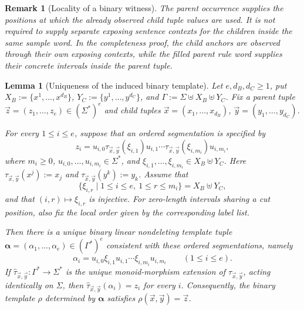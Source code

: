 \documentclass[11pt,a4paper]{article}
\newtheorem{lemma}[theorem]{Lemma}
\newtheorem{remark}[theorem]{Remark}
\theoremstyle{remark}
\newcommand{\tuple}[1]{\vec{#1}}
\begin{document}
\begin{remark}[Locality of a binary witness]
\label{rem:binary-witness-locality}
The parent occurrence supplies the positions at which the already observed
child tuple values are used.  It is not required to supply separate exposing
sentence contexts for the children inside the same sample word.  In the
completeness proof, the child anchors are observed through their own exposing
contexts, while the filled parent rule word supplies their concrete intervals
inside the parent tuple.
\end{remark}

\begin{lemma}[Uniqueness of the induced binary template]
\label{lem:unique-induced-template}
Let \(e,d_B,d_C\ge1\), put
\(X_B:=\{x^1,\ldots,x^{d_B}\}\),
\(Y_C:=\{y^1,\ldots,y^{d_C}\}\), and
\(\Gamma:=\Sigma\uplus X_B\uplus Y_C\).  Fix a parent tuple
\(\tuple z=(z_1,\ldots,z_e)\in(\Sigma^*)^e\) and child tuples
\(\tuple x=(x_1,\ldots,x_{d_B})\),
\(\tuple y=(y_1,\ldots,y_{d_C})\).

For every \(1\le i\le e\), suppose that an ordered segmentation is specified by
\[
  z_i=u_{i,0}\tau_{\tuple x,\tuple y}(\xi_{i,1})u_{i,1}\cdots
      \tau_{\tuple x,\tuple y}(\xi_{i,m_i})u_{i,m_i},
  \tag{1}
\]
where \(m_i\ge0\), \(u_{i,0},\ldots,u_{i,m_i}\in\Sigma^*\), and
\(\xi_{i,1},\ldots,\xi_{i,m_i}\in X_B\uplus Y_C\).  Here
\(\tau_{\tuple x,\tuple y}(x^j):=x_j\) and
\(\tau_{\tuple x,\tuple y}(y^k):=y_k\).  Assume that
\[
  \{\xi_{i,r}\mid 1\le i\le e,\ 1\le r\le m_i\}=X_B\uplus Y_C,
  \tag{2}
\]
and that \((i,r)\mapsto\xi_{i,r}\) is injective.  For zero-length intervals
sharing a cut position, also fix the local order given by the corresponding
label list.

Then there is a unique binary linear nondeleting template tuple
\(\boldsymbol\alpha=(\alpha_1,\ldots,\alpha_e)\in(\Gamma^*)^e\) consistent
with these ordered segmentations, namely
\[
  \alpha_i=u_{i,0}\xi_{i,1}u_{i,1}\cdots
  \xi_{i,m_i}u_{i,m_i}\qquad(1\le i\le e).
  \tag{3}
\]
If \(\widehat\tau_{\tuple x,\tuple y}:\Gamma^*\to\Sigma^*\) is the unique
monoid-morphism extension of \(\tau_{\tuple x,\tuple y}\), acting identically
on \(\Sigma\), then
\(\widehat\tau_{\tuple x,\tuple y}(\alpha_i)=z_i\) for every \(i\).
Consequently, the binary template \(\rho\) determined by
\(\boldsymbol\alpha\) satisfies
\(\rho(\tuple x,\tuple y)=\tuple z\).
\end{lemma}
\end{document}
